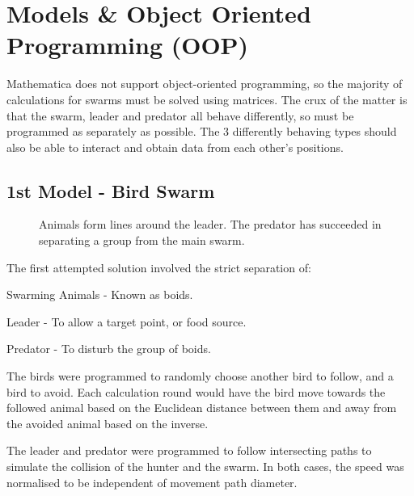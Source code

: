 \documentclass[
reprint,
showpacs,
preprintnumbers,
bibnotes,
amsmath,
amssymb,
aps,
pra,
floatfix,
]{revtex4-1}
\begin{document}
\section{\label{sec:oop}Models \& Object Oriented Programming (OOP)}

Mathematica does not support object-oriented programming, so the majority of calculations for swarms must be solved using matrices.
The crux of the matter is that the swarm, leader and predator all behave differently, so must be programmed as separately as possible.
The 3 differently behaving types should also be able to interact and obtain data from each other's positions.

\subsection{\label{sec:birdswarm}1st Model - Bird Swarm}

\begin{figure}[!htp]

	\caption{
		Animals form lines around the leader.
		The predator has succeeded in separating a group from the main swarm.
	}

	\label{fig:animallines}
\end{figure}

The first attempted solution involved the strict separation of:
\begin{description}
	\item{Swarming Animals - Known as boids.}
	\item{Leader - To allow a target point, or food source.}
	\item{Predator - To disturb the group of boids.}
\end{description}

The birds were programmed to randomly choose another bird to follow, and a bird to avoid.
Each calculation round would have the bird move towards the followed animal based on the Euclidean distance between them and away from the avoided animal based on the inverse.

The leader and predator were programmed to follow intersecting paths to simulate the collision of the hunter and the swarm.
In both cases, the speed was normalised to be independent of movement path diameter.
\end{document}
